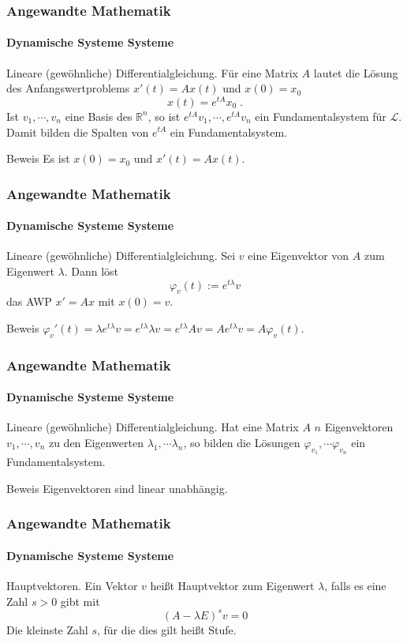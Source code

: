 \documentclass{beamer}
\begin{document}
\begin{frame}
    \frametitle{Angewandte Mathematik}
\framesubtitle{Dynamische Systeme Systeme}
\begin{block}{Lineare (gewöhnliche) Differentialgleichung.}
Für eine Matrix $A$ lautet die Lösung des Anfangswertproblems $x'(t) = Ax(t)$ und $x(0) = x_0$
$$ x(t) = e^{tA} x_0 \;.$$ Ist $v_1, \cdots , v_n$ eine Basis des $\mathbb{R}^n$, so ist $e^{tA}v_1, \cdots , e^{tA}v_n$ ein Fundamentalsystem für $\mathcal{L}$. Damit bilden die Spalten von  $e^{tA}$ ein Fundamentalsystem.
\end{block}

\begin{block}{Beweis}
Es ist $x(0) = x_0$ und $x'(t)= A x(t)$. 
\end{block}
 \end{frame}


\begin{frame}
    \frametitle{Angewandte Mathematik}
\framesubtitle{Dynamische Systeme Systeme}
\begin{block}{Lineare (gewöhnliche) Differentialgleichung.}
Sei $v$ eine Eigenvektor von $A$ zum Eigenwert $\lambda$. Dann löst 
$$ \varphi_v(t) := e^{t \lambda} v$$ das AWP $x' = Ax$ mit $x(0) = v$.

\end{block}
\begin{block}{Beweis}
$\varphi_v'(t) =  \lambda  e^{t \lambda}  v =  e^{t\lambda}  \lambda v =  e^{t\lambda}  A v  = A e^{t\lambda}   v  = A  \varphi_v(t)$.

\end{block}
 \end{frame}

\begin{frame}
    \frametitle{Angewandte Mathematik}
\framesubtitle{Dynamische Systeme Systeme}
\begin{block}{Lineare (gewöhnliche) Differentialgleichung.}
Hat eine Matrix $A$ $n$ Eigenvektoren $v_1, \cdots , v_n$ zu den Eigenwerten $\lambda_1, \cdots  \lambda_n$, 
so bilden die Lösungen $ \varphi_{v_1}, \cdots  \varphi_{v_n}$ ein Fundamentalsystem.
\end{block}
\begin{block}{Beweis}
Eigenvektoren sind linear unabhängig.
\end{block}
 \end{frame}


\begin{frame}
    \frametitle{Angewandte Mathematik}
\framesubtitle{Dynamische Systeme Systeme}
\begin{block}{Hauptvektoren.}
Ein Vektor $v$ heißt Hauptvektor zum Eigenwert $\lambda$, falls es eine Zahl $s>0$ gibt mit 
$$ (A - \lambda E)^s v = 0$$
Die kleinste Zahl $s$, für die dies gilt heißt Stufe.
\end{block}

 \end{frame}
\end{document}
